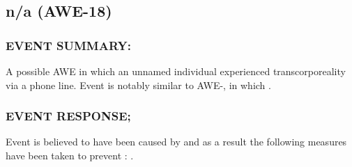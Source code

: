 \subsection*{n/a (AWE-18)}
\subsubsection*{EVENT SUMMARY:}
\par A possible AWE in which an unnamed individual experienced
transcorporeality via a phone line. Event is notably similar to
AWE-, in which  .
\subsubsection*{EVENT RESPONSE;}
\par Event is believed to have been caused by  
and as a result the following measures have been taken to prevent : 
 .